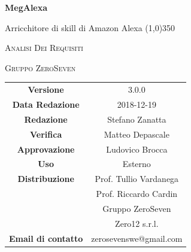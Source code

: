 \documentclass[a4paper,12pt,openany]{book}
\author{Ludovico Brocca}
\date{2018-12-19}
\begin{document}
\begin{titlepage}
	\centering
	{\huge\bfseries MegAlexa \par}
	Arricchitore di skill di Amazon Alexa
	\line(1,0){350} \\
	{\scshape\LARGE Analisi Dei Requisiti \par}
	\vspace{1cm}
	{\scshape Gruppo ZeroSeven \par}
	\logo
	\begin{tabular}{c|c}
		{\hfill \textbf{Versione}} 			& 3.0.0			\\
		{\hfill\textbf{Data Redazione}} 	& 2018-12-19		\\ 
		{\hfill\textbf{Redazione}} 			&  		Stefano Zanatta \\
		{\hfill\textbf{Verifica}} 				&  	Matteo Depascale\\
		{\hfill\textbf{Approvazione}} 		&  	Ludovico Brocca		\\ 
		{\hfill\textbf{Uso}} 					& 		Esterno		\\ 
		{\hfill\textbf{Distribuzione}} 			& 			Prof. Tullio Vardanega \\ & Prof. Riccardo Cardin \\ & Gruppo ZeroSeven	\\ & Zero12 s.r.l. \\
		{\hfill\textbf{Email di contatto}} & zerosevenswe@gmail.com \\
	\end{tabular}
\end{titlepage}
	
	\newpage
	
	\label{LastFrontPage}
	\pagestyle{mymain}
	\tableofcontents
	\listoffigures
	\listoftables
	
	
	
	
	\label{LastPage}
\end{document}

